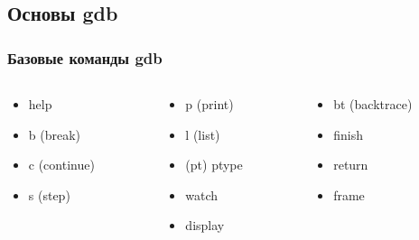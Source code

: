 \subsection[intro]{Основы gdb}
\begin{frame}
  \frametitle{Базовые команды gdb}
  \begin{columns}
    \begin{column}{0.3\textwidth}
      \begin{itemize}
        \item help
        \item b (break)
        \item c (continue)
        \item s (step)
      \end{itemize}
    \end{column}
    
    \begin{column}{0.3\textwidth}
      \begin{itemize}
        \item p (print)
        \item l (list)
        \item (pt) ptype
        \item watch
        \item display
      \end{itemize}
    \end{column}

    \begin{column}{0.3\textwidth}
      \begin{itemize}
        \item bt (backtrace)
        \item finish
        \item return
        \item frame
      \end{itemize}
    \end{column}
  \end{columns}
\end{frame}

